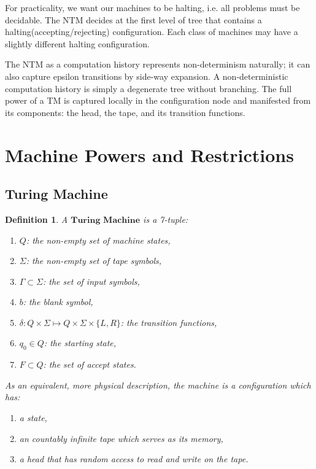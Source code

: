 \documentclass[12pt]{article}  %
\newtheorem{definition}{Definition}
\begin{document}
For practicality, we want our machines to be halting, i.e. all problems must be decidable. The NTM decides at the first level of tree that contains a halting(accepting/rejecting) configuration. Each class of machines may have a slightly different halting configuration.

The NTM as a computation history represents non-determinism naturally; it can also capture epsilon transitions by side-way expansion. A non-deterministic computation history is simply a degenerate tree without branching. The full power of a TM is captured locally in the configuration node and manifested from its components: the head, the tape, and its transition functions.




\section{Machine Powers and Restrictions}

\subsection{Turing Machine}

\begin{definition}
A $\textbf{Turing Machine}$ is a 7-tuple:
\begin{enumerate}
	\item $Q$: the non-empty set of machine states,
	\item $\Sigma$: the non-empty set of tape symbols,
	\item $\Gamma \subset \Sigma$: the set of input symbols,
	\item $b$: the blank symbol,
	\item $\delta: Q \times \Sigma \mapsto Q \times \Sigma \times \{L, R\} $: the transition functions,
	\item $q_0 \in Q$: the starting state,
	\item $F \subset Q$: the set of accept states.
\end{enumerate}

As an equivalent, more physical description, the machine is a configuration which has:
\begin{enumerate}
	\item a state,
	\item an countably infinite tape which serves as its memory,
	\item a head that has random access to read and write on the tape.
\end{enumerate}
\end{definition}
\end{document}
